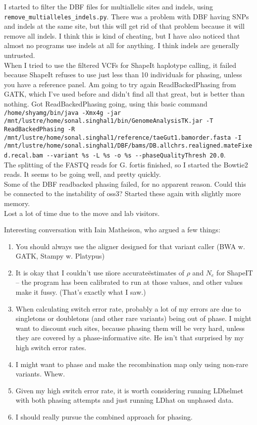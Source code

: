 \documentclass[idxtotoc,hyperref,openany,oneside]{labbook} %
\begin{document}
I started to filter the DBF files for multiallelic sites and indels, using \verb+remove_multialleles_indels.py+. There was a problem with DBF having SNPs and indels at the same site, but this will get rid of that problem because it will remove all indels. I think this is kind of cheating, but I have also noticed that almost no programs use indels at all for anything. I think indels are generally untrusted. \\

When I tried to use the filtered VCFs for ShapeIt haplotype calling, it failed because ShapeIt refuses to use just less than 10 individuals for phasing, unless you have a reference panel. Am going to try again ReadBackedPhasing from GATK, which I've used before and didn't find all that great, but is better than nothing. Got ReadBackedPhasing going, using this basic command \verb+/home/shyamg/bin/java -Xmx4g -jar /mnt/lustre/home/sonal.singhal1/bin/GenomeAnalysisTK.jar -T ReadBackedPhasing -R /mnt/lustre/home/sonal.singhal1/reference/taeGut1.bamorder.fasta -I /mnt/lustre/home/sonal.singhal1/DBF/bams/DB.allchrs.realigned.mateFixed.recal.bam --variant %s -L %s -o %s --phaseQualityThresh 20.0+. \\

The splitting of the FASTQ reads for G. fortis finished, so I started the Bowtie2 reads. It seems to be going well, and pretty quickly. \\

Some of the DBF readbacked phasing failed, for no apparent reason. Could this be connected to the instability of oss3? Started these again with slightly more memory. \\

Lost a lot of time due to the move and lab visitors. 

Interesting conversation with Iain Matheison, who argued a few things:
\begin{enumerate}
\item You should always use the aligner designed for that variant caller (BWA w. GATK, Stampy w. Platypus)
\item It is okay that I couldn't use \"more accurate\" estimates of $\rho$ and $N_e$ for ShapeIT -- the program has been calibrated to run at those values, and other values make it fussy. (That's exactly what I saw.)
\item When calculating switch error rate, probably a lot of my errors are due to singletons or doubletons (and other rare variants) being out of phase. I might want to discount such sites, because phasing them will be very hard, unless they are covered by a phase-informative site. He isn't that surprised by my high switch error rates.
\item I might want to phase and make the recombination map only using non-rare variants. Whew.
\item Given my high switch error rate, it is worth considering running LDhelmet with both phasing attempts and just running LDhat on unphased data.
\item I should really pursue the combined approach for phasing.
\end{enumerate}
\end{document}
